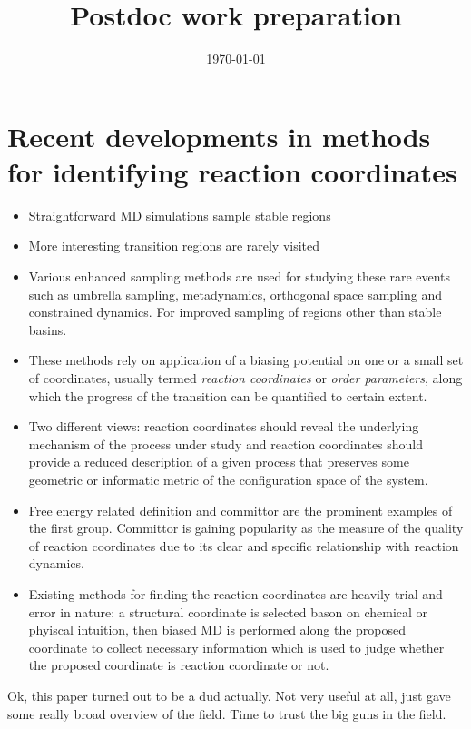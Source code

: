 \documentclass{article}
\title{Postdoc work preparation}
\date{\today}
\begin{document}
\maketitle
%
\section{Recent developments in methods for identifying reaction coordinates}
\begin{itemize}
\item Straightforward MD simulations sample stable regions
\item More interesting transition regions are rarely visited
\item Various enhanced sampling methods are used for studying these rare events such as 
umbrella sampling, metadynamics, orthogonal space sampling and constrained dynamics. For
improved sampling of regions other than stable basins.  
\item These methods rely on application of a biasing potential on one or a small set of 
coordinates, usually termed \emph{reaction coordinates} or \emph{order parameters},
along which the progress of the transition can be quantified to certain extent. 
\item Two different views: reaction coordinates should reveal the underlying mechanism of the process
under study and reaction coordinates should provide a reduced description of a given process that preserves
some geometric or informatic metric of the configuration space of the system. 
\item Free energy related definition and committor are the prominent examples of the first group. 
Committor is gaining popularity as the measure of the quality of reaction coordinates due to its clear
and specific relationship with reaction dynamics. 
\item Existing methods for finding the reaction coordinates are heavily trial and error in
nature: a structural coordinate is selected bason on chemical or phyiscal intuition,
then biased MD is performed along the proposed coordinate to collect necessary information
which is used to judge whether the proposed coordinate is reaction coordinate or not. 
\end{itemize}
Ok, this paper turned out to be a dud actually. Not very useful at all, just gave some 
really broad overview of the field. Time to trust the big guns in the field. 
\end{document}

